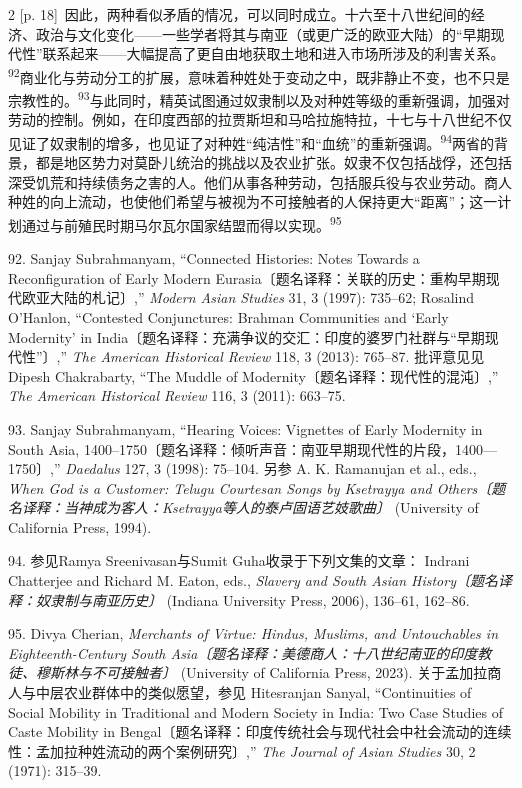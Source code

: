 \documentclass[10pt,a4paper]{article}
\begin{document}
\begin{paracol}{2}
{\scriptsize\color{gray} [p. 18]}\ 因此，两种看似矛盾的情况，可以同时成立。十六至十八世纪间的经济、政治与文化变化——一些学者将其与南亚（或更广泛的欧亚大陆）的“早期现代性”联系起来——大幅提高了更自由地获取土地和进入市场所涉及的利害关\mbox{系。\textsuperscript{92}}商业化与劳动分工的扩展，意味着种姓处于变动之中，既非静止不变，也不只是宗教性\mbox{的。\textsuperscript{93}}与此同时，精英试图通过奴隶制以及对种姓等级的重新强调，加强对劳动的控制。例如，在印度西部的拉贾斯坦和马哈拉施特拉，十七与十八世纪不仅见证了奴隶制的增多，也见证了对种姓“纯洁性”和“血统”的重新强\mbox{调。\textsuperscript{94}}两省的背景，都是地区势力对莫卧儿统治的挑战以及农业扩张。奴隶不仅包括战俘，还包括深受饥荒和持续债务之害的人。他们从事各种劳动，包括服兵役与农业劳动。商人种姓的向上流动，也使他们希望与被视为不可接触者的人保持更大“距离”；这一计划通过与前殖民时期马尔瓦尔国家结盟而得以实\mbox{现。\textsuperscript{95}}\par{\small 92. Sanjay Subrahmanyam, “Connected Histories: Notes Towards a Reconfiguration of Early Modern Eurasia〔题名译释：关联的历史：重构早期现代欧亚大陆的札记〕,” \textit{Modern Asian Studies} 31, 3 (1997): 735–62; Rosalind O’Hanlon, “Contested Conjunctures: Brahman Communities and ‘Early Modernity’ in India〔题名译释：充满争议的交汇：印度的婆罗门社群与“早期现代性”〕,” \textit{The American Historical Review} 118, 3 (2013): 765–87. 批评意见见 Dipesh Chakrabarty, “The Muddle of Modernity〔题名译释：现代性的混沌〕,” \textit{The American Historical Review} 116, 3 (2011): 663–75.\par}{\small 93. Sanjay Subrahmanyam, “Hearing Voices: Vignettes of Early Modernity in South Asia, 1400–1750〔题名译释：倾听声音：南亚早期现代性的片段，1400—1750〕,” \textit{Daedalus} 127, 3 (1998): 75–104. 另参 A. K. Ramanujan et al., eds., \textit{When God is a Customer: Telugu Courtesan Songs by Ksetrayya and Others〔题名译释：当神成为客人：Ksetrayya等人的泰卢固语艺妓歌曲〕} (University of California Press, 1994).\par}{\small 94. 参见Ramya Sreenivasan与Sumit Guha收录于下列文集的文章： Indrani Chatterjee and Richard M. Eaton, eds., \textit{Slavery and South Asian History〔题名译释：奴隶制与南亚历史〕} (Indiana University Press, 2006), 136–61, 162–86.\par}{\small 95. Divya Cherian, \textit{Merchants of Virtue: Hindus, Muslims, and Untouchables in Eighteenth-Century South Asia〔题名译释：美德商人：十八世纪南亚的印度教徒、穆斯林与不可接触者〕} (University of California Press, 2023). 关于孟加拉商人与中层农业群体中的类似愿望，参见 Hitesranjan Sanyal, “Continuities of Social Mobility in Traditional and Modern Society in India: Two Case Studies of Caste Mobility in Bengal〔题名译释：印度传统社会与现代社会中社会流动的连续性：孟加拉种姓流动的两个案例研究〕,” \textit{The Journal of Asian Studies} 30, 2 (1971): 315–39.\par}

\end{paracol}
\end{document}
